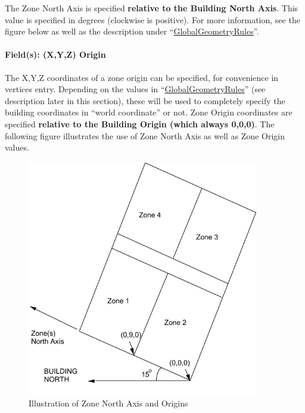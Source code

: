 The Zone North Axis is specified \textbf{relative to the Building North Axis}. This value is specified in degrees (clockwise is positive). For more information, see the figure below as well as the description under ``\hyperref[globalgeometryrules]{GlobalGeometryRules}''.

\paragraph{Field(s): (X,Y,Z) Origin}\label{fields-xyz-origin}

The X,Y,Z coordinates of a zone origin can be specified, for convenience in vertices entry. Depending on the values in ``\hyperref[globalgeometryrules]{GlobalGeometryRules}'' (see description later in this section), these will be used to completely specify the building coordinates in ``world coordinate'' or not. Zone Origin coordinates are specified \textbf{relative to the Building Origin (which always 0,0,0)}. The following figure illustrates the use of Zone North Axis as well as Zone Origin values.

\begin{figure}[hbtp] %
\centering
\includegraphics[width=0.9\textwidth, height=0.9\textheight, keepaspectratio=true]{media/image053.png}
\caption{Illustration of Zone North Axis and Origins \protect \label{fig:illustration-of-zone-north-axis-and-origins}}
\end{figure}

